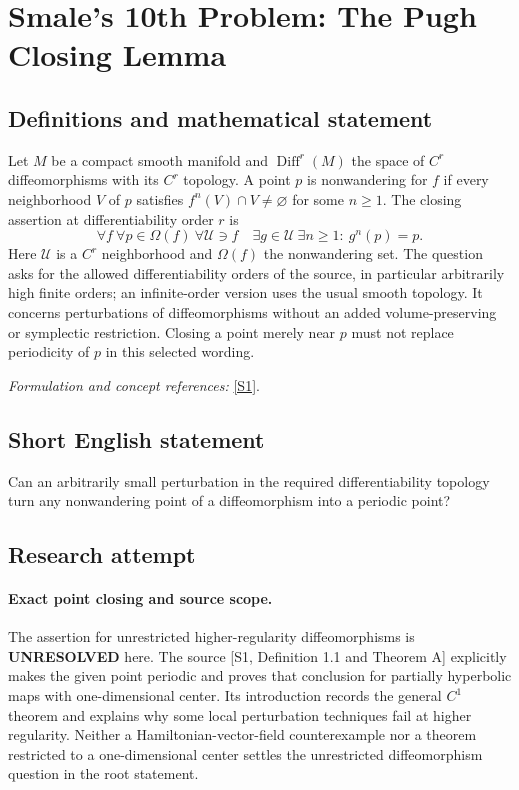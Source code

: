 \documentclass[11pt]{article}
\begin{document}
\section*{\texorpdfstring{Smale's 10th Problem: The Pugh Closing Lemma}{Smale's 10th Problem: The Pugh Closing Lemma}}\label{53}
\subsection{Definitions and mathematical statement}
Let $M$ be a compact smooth manifold and $\operatorname{Diff}^r(M)$ the space of $C^r$ diffeomorphisms with its $C^r$ topology. A point $p$ is nonwandering for $f$ if every neighborhood $V$ of $p$ satisfies $f^n(V)\cap V\ne\varnothing$ for some $n\ge1$. The closing assertion at differentiability order $r$ is
\[
 \forall f\ \forall p\in\Omega(f)\ \forall\mathcal U\ni f
 \quad\exists g\in\mathcal U\ \exists n\ge1:\ g^n(p)=p.
\]
Here $\mathcal U$ is a $C^r$ neighborhood and $\Omega(f)$ the nonwandering set. The question asks for the allowed differentiability orders of the source, in particular arbitrarily high finite orders; an infinite-order version uses the usual smooth topology. It concerns perturbations of diffeomorphisms without an added volume-preserving or symplectic restriction. Closing a point merely near $p$ must not replace periodicity of $p$ in this selected wording.
\par\smallskip\textit{Formulation and concept references:} \href{https://arxiv.org/html/2004.06855v2}{[S1]}.

\subsection{Short English statement}
Can an arbitrarily small perturbation in the required differentiability topology turn any nonwandering point of a diffeomorphism into a periodic point?
\subsection{Research attempt}
\paragraph{Exact point closing and source scope.}
The assertion for unrestricted higher-regularity diffeomorphisms
is \textbf{UNRESOLVED} here. The source [S1, Definition 1.1 and
Theorem A] explicitly makes the given point periodic and proves
that conclusion for partially hyperbolic maps with one-dimensional
center. Its introduction records the general $C^1$ theorem and
explains why some local perturbation techniques fail at higher
regularity. Neither a Hamiltonian-vector-field counterexample nor
a theorem restricted to a one-dimensional center settles the
unrestricted diffeomorphism question in the root statement.
\end{document}

